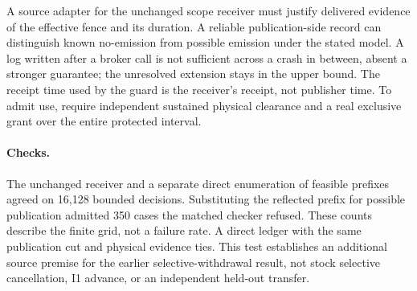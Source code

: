 \documentclass[11pt]{article}
\begin{document}
A source adapter for the unchanged scope receiver must justify delivered
evidence of the effective fence and its duration. A reliable
publication-side record can distinguish known no-emission from possible
emission under the stated model. A log written after a broker call is
not sufficient across a crash in between, absent a stronger guarantee;
the unresolved extension stays in the upper bound. The receipt time
used by the guard is the receiver's receipt, not publisher time. To
admit use, require independent sustained physical clearance and a real
exclusive grant over the entire protected interval.

\paragraph{Checks.}
The unchanged receiver and a separate direct enumeration of feasible
prefixes agreed on 16,128 bounded decisions. Substituting the reflected
prefix for possible publication admitted 350 cases the matched checker
refused. These counts describe the finite grid, not a failure rate.
A direct ledger with the same publication cut and physical evidence ties.
This test establishes an additional source premise for the earlier
selective-withdrawal result, not stock selective cancellation, I1
advance, or an independent held-out transfer.
\end{document}
